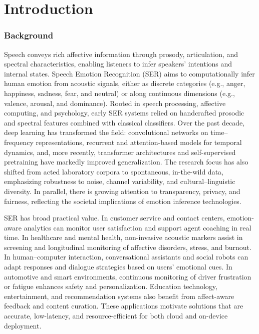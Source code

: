 
\chapter{Introduction}


\subsection{Background}Speech conveys rich affective information through prosody, articulation, and spectral characteristics, enabling listeners to infer speakers’ intentions and internal states. Speech Emotion Recognition (SER) aims to computationally infer human emotion from acoustic signals, either as discrete categories (e.g., anger, happiness, sadness, fear, and neutral) or along continuous dimensions (e.g., valence, arousal, and dominance). Rooted in speech processing, affective computing, and psychology, early SER systems relied on handcrafted prosodic and spectral features combined with classical classifiers. Over the past decade, deep learning has transformed the field: convolutional networks on time–frequency representations, recurrent and attention-based models for temporal dynamics, and, more recently, transformer architectures and self-supervised pretraining have markedly improved generalization. The research focus has also shifted from acted laboratory corpora to spontaneous, in-the-wild data, emphasizing robustness to noise, channel variability, and cultural–linguistic diversity. In parallel, there is growing attention to transparency, privacy, and fairness, reflecting the societal implications of emotion inference technologies.

SER has broad practical value. In customer service and contact centers, emotion-aware analytics can monitor user satisfaction and support agent coaching in real time. In healthcare and mental health, non-invasive acoustic markers assist in screening and longitudinal monitoring of affective disorders, stress, and burnout. In human–computer interaction, conversational assistants and social robots can adapt responses and dialogue strategies based on users’ emotional cues. In automotive and smart environments, continuous monitoring of driver frustration or fatigue enhances safety and personalization. Education technology, entertainment, and recommendation systems also benefit from affect-aware feedback and content curation. These applications motivate solutions that are accurate, low-latency, and resource-efficient for both cloud and on-device deployment.

